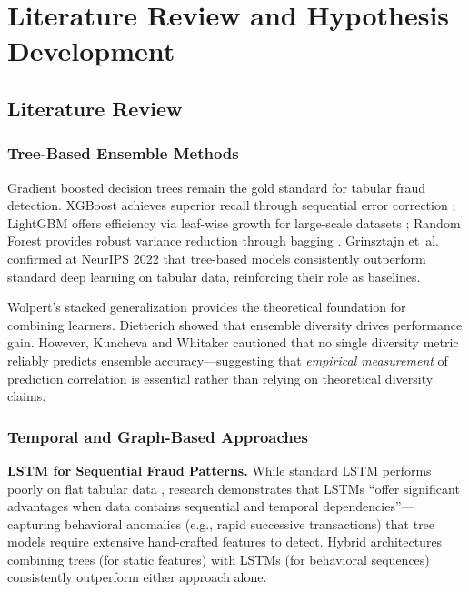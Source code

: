 \documentclass[10pt,a4paper,twocolumn]{article}
\begin{document}
\section{Literature Review and Hypothesis Development}

\subsection{Literature Review}

\subsubsection{Tree-Based Ensemble Methods}

Gradient boosted decision trees remain the gold standard for tabular fraud detection. XGBoost achieves superior recall through sequential error correction \cite{chen2016}; LightGBM offers efficiency via leaf-wise growth for large-scale datasets \cite{ke2017}; Random Forest provides robust variance reduction through bagging \cite{breiman2001}. Grinsztajn et~al. \cite{grinsztajn2022} confirmed at NeurIPS 2022 that tree-based models consistently outperform standard deep learning on tabular data, reinforcing their role as baselines.

Wolpert's stacked generalization \cite{wolpert1992} provides the theoretical foundation for combining learners. Dietterich \cite{dietterich2000} showed that ensemble diversity drives performance gain. However, Kuncheva and Whitaker \cite{kuncheva2003} cautioned that no single diversity metric reliably predicts ensemble accuracy---suggesting that \emph{empirical measurement} of prediction correlation is essential rather than relying on theoretical diversity claims.

\subsubsection{Temporal and Graph-Based Approaches}

\textbf{LSTM for Sequential Fraud Patterns.} While standard LSTM performs poorly on flat tabular data \cite{jurgovsky2018}, research demonstrates that LSTMs ``offer significant advantages when data contains sequential and temporal dependencies''---capturing behavioral anomalies (e.g., rapid successive transactions) that tree models require extensive hand-crafted features to detect. Hybrid architectures combining trees (for static features) with LSTMs (for behavioral sequences) consistently outperform either approach alone.
\end{document}
